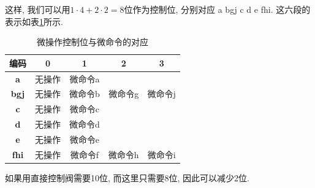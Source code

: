 \documentclass[UTF8]{report}
\newenvironment{solution}{{\noindent\hskip 2em \bf 解 \quad}}{}
\begin{document}
\begin{solution}
    \newpage
    
    这样, 我们可以用$1 \cdot 4 + 2 \cdot 2 = 8$位作为控制位, 分别对应 a bgj c d e fhi. 这六段的表示如表\ref{tab:10_21_3}所示.
    \begin{table}[htbp]
        \centering
        \caption{微操作控制位与微命令的对应}
        \begin{tabular}{|c|c|c|c|c|}
            \hline
            \textbf{编码} & \textbf{0} & \textbf{1} & \textbf{2} & \textbf{3} \bigstrut\\
            \hline
            \rowcolor[rgb]{ .867,  .851,  .769} \textbf{a} & \cellcolor[rgb]{ 1,  1,  1}无操作 & \cellcolor[rgb]{ 1,  1,  1}微命令a & \multicolumn{2}{c|}{\cellcolor[rgb]{ 1,  1,  1}} \bigstrut\\
            \hline
            \rowcolor[rgb]{ .867,  .851,  .769} \textbf{bgj} & \cellcolor[rgb]{ 1,  1,  1}无操作 & \cellcolor[rgb]{ 1,  1,  1}微命令b & \cellcolor[rgb]{ 1,  1,  1}微命令g & \cellcolor[rgb]{ 1,  1,  1}微命令j \bigstrut\\
            \hline
            \rowcolor[rgb]{ .867,  .851,  .769} \textbf{c} & \cellcolor[rgb]{ 1,  1,  1}无操作 & \cellcolor[rgb]{ 1,  1,  1}微命令c & \multicolumn{2}{c|}{\cellcolor[rgb]{ 1,  1,  1}} \bigstrut\\
            \hline
            \rowcolor[rgb]{ .867,  .851,  .769} \textbf{d} & \cellcolor[rgb]{ 1,  1,  1}无操作 & \cellcolor[rgb]{ 1,  1,  1}微命令d & \multicolumn{2}{c|}{\cellcolor[rgb]{ 1,  1,  1}} \bigstrut\\
            \hline
            \rowcolor[rgb]{ .867,  .851,  .769} \textbf{e} & \cellcolor[rgb]{ 1,  1,  1}无操作 & \cellcolor[rgb]{ 1,  1,  1}微命令e & \multicolumn{2}{c|}{\cellcolor[rgb]{ 1,  1,  1}} \bigstrut\\
            \hline
            \rowcolor[rgb]{ .867,  .851,  .769} \textbf{fhi} & \cellcolor[rgb]{ 1,  1,  1}无操作 & \cellcolor[rgb]{ 1,  1,  1}微命令f & \cellcolor[rgb]{ 1,  1,  1}微命令h & \cellcolor[rgb]{ 1,  1,  1}微命令i \bigstrut\\
            \hline
        \end{tabular}%
        \label{tab:10_21_3}%
    \end{table}%

    如果用直接控制阀需要10位, 而这里只需要8位, 因此可以减少2位.
\end{solution}
\end{document}
